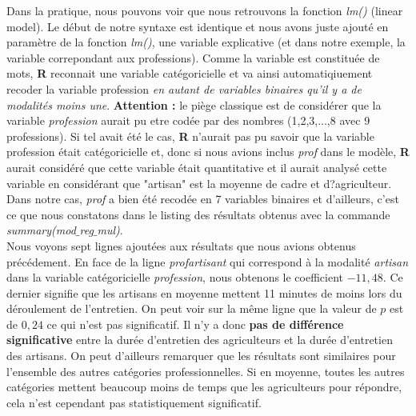 Dans la pratique, nous pouvons voir que nous retrouvons la fonction \textit{lm()} (linear model).\newline
Le début de notre syntaxe est identique et nous avons juste ajouté en paramètre de la fonction \textit{lm()}, une variable explicative (et dans notre exemple, la variable correpondant aux professions).\newline
Comme la variable est constituée de mots, \textbf{R} reconnait une variable catégoricielle et va ainsi automatiqiuement recoder la variable profession \textit{en autant de variables binaires qu'il y a de modalités moins une}.\newline
\textbf{Attention : } le piège classique est de considérer que la variable \textit{profession} aurait pu etre codée par des nombres (1,2,3,...,8 avec 9 professions). Si tel avait été le cas, \textbf{R} n'aurait pas pu savoir que la variable profession était catégoricielle et, donc si nous avions inclus \textit{prof} dans le modèle, \textbf{R} aurait considéré que cette variable était quantitative et il aurait analysé cette variable en considérant que "artisan" est la moyenne de cadre et d?agriculteur. \newline
\\
Dans notre cas, \textit{prof} a bien été recodée en 7 variables binaires et d'ailleurs, c'est ce que nous constatons dans le listing des résultats obtenus avec la commande \textit{summary(mod$\_$reg$\_$mul)}.\newline
\\
Nous voyons sept lignes ajoutées aux résultats que nous avions obtenus précédement. \newline
En face de la ligne \textit{profartisant} qui correspond à la modalité \textit{artisan} dans la variable catégoricielle \textit{profession}, nous obtenons le coefficient $-11,48$. Ce dernier signifie que les artisans en moyenne mettent 11 minutes de moins lors du déroulement de l'entretien. On peut voir sur la même ligne que la valeur de $p$ est de $0,24$ ce qui n'est pas significatif.\newline
Il n'y a donc \textbf{pas de différence significative} entre la durée d'entretien des agriculteurs et la durée d'entretien des artisans. On peut d'ailleurs remarquer que les résultats sont similaires pour l'ensemble des autres catégories professionnelles.\newline
Si en moyenne, toutes les autres catégories mettent beaucoup moins de temps que les agriculteurs pour répondre, cela n'est cependant pas statistiquement significatif.\newline
